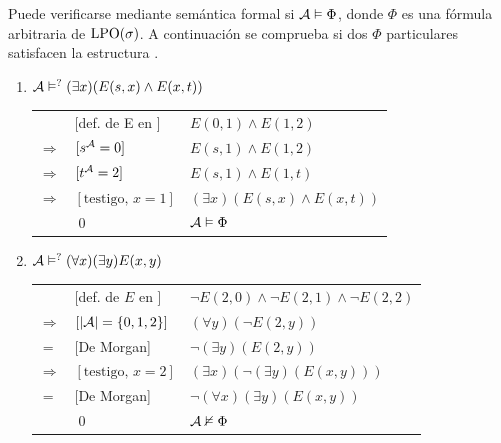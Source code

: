 Puede verificarse mediante semántica formal si $\mathcal{A}\vDash\Phi$, donde $\Phi$
es una fórmula arbitraria de $\text{LPO}(\sigma)$. A continuación se comprueba si dos
$\Phi$ particulares satisfacen la estructura \A.

\begin{enumerate}
\item $\mathcal{A}\vDash^?(\exists x)(E(s,x)\land E(x,t))$
\begin{center}
\begin{tabular}{lll}
&[def. de E en \A] & $E(0, 1) \land E(1, 2)$\\
$\Rightarrow$ & $[s^{\mathcal{A}} = 0]$ & $E(s, 1) \land E(1, 2)$\\
$\Rightarrow$ & $[t^{\mathcal{A}} = 2]$ & $E(s, 1) \land E(1, t)$\\
$\Rightarrow$ & $[\mbox{testigo, } x = 1]$ & $(\exists x)(E(s, x) \land E(x, t))$\\
&\qed & $\mathcal{A} \vDash \Phi$
\end{tabular}
\end{center}

\item $\mathcal{A}\vDash^?(\forall x)(\exists y)E(x,y)$
\begin{center}
\begin{tabular}{lll}
&[def. de $E$ en \A] & $\neg E(2, 0) \land \neg E(2, 1) \land \neg E(2, 2)$\\
$\Rightarrow$ & $[|\mathcal{A}| = \{0,1,2\}]$ & $(\forall y) (\neg E(2, y))$\\
$=$ & [De Morgan] & $\neg (\exists y) (E(2, y))$\\
$\Rightarrow$ & $[\mbox{testigo, } x = 2]$ & $(\exists x) (\neg (\exists y) (E(x, y)))$\\
$=$ & [De Morgan] & $\neg (\forall x) (\exists y) (E(x, y))$\\
&\qed & $\mathcal{A} \nvDash \Phi$
\end{tabular}
\end{center}
\end{enumerate}

